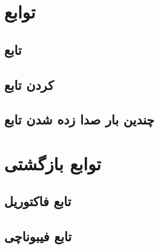 \documentclass[11pt, dvipsnames, svgnames, x11names]{article}
\begin{document}
\section{توابع}

\subsection{تابع }

\subsection{ کردن تابع}

\subsection{چندین بار صدا زده شدن تابع}

\section{توابع بازگشتی}

\subsection{تابع فاکتوریل}

\subsection{تابع فیبوناچی}
\end{document}
